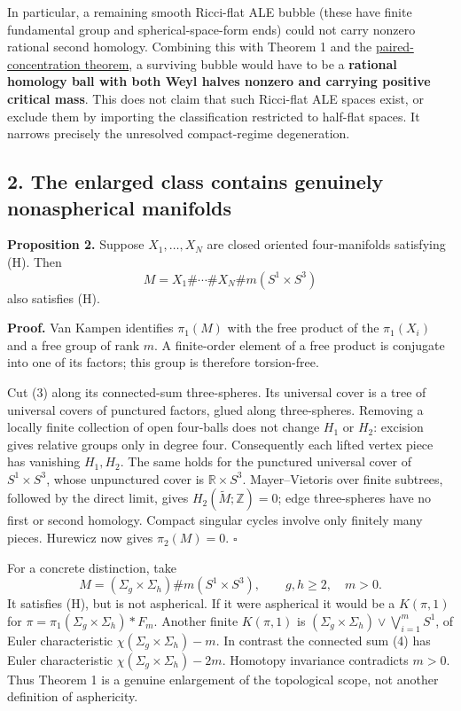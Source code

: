 \documentclass[
  11pt,
]{article}
\begin{document}
In particular, a remaining smooth Ricci-flat ALE bubble (these have
finite fundamental group and spherical-space-form ends) could not carry
nonzero rational second homology. Combining this with Theorem 1 and the
\href{20260923_critical_chiral_threshold.md}{paired-concentration
theorem}, a surviving bubble would have to be a \textbf{rational
homology ball with both Weyl halves nonzero and carrying positive
critical mass}. This does not claim that such Ricci-flat ALE spaces
exist, or exclude them by importing the classification restricted to
half-flat spaces. It narrows precisely the unresolved compact-regime
degeneration.

\hypertarget{the-enlarged-class-contains-genuinely-nonaspherical-manifolds}{%
\subsection{2. The enlarged class contains genuinely nonaspherical
manifolds}\label{the-enlarged-class-contains-genuinely-nonaspherical-manifolds}}

\textbf{Proposition 2.} Suppose \(X_1,\ldots,X_N\) are closed oriented
four-manifolds satisfying (H). Then \[
 M=X_1\#\cdots\#X_N\#m(S^1\times S^3)
 \tag{3}
\] also satisfies (H).

\textbf{Proof.} Van Kampen identifies \(\pi_1(M)\) with the free product
of the \(\pi_1(X_i)\) and a free group of rank \(m\). A finite-order
element of a free product is conjugate into one of its factors; this
group is therefore torsion-free.

Cut (3) along its connected-sum three-spheres. Its universal cover is a
tree of universal covers of punctured factors, glued along
three-spheres. Removing a locally finite collection of open four-balls
does not change \(H_1\) or \(H_2\): excision gives relative groups only
in degree four. Consequently each lifted vertex piece has vanishing
\(H_1,H_2\). The same holds for the punctured universal cover of
\(S^1\times S^3\), whose unpunctured cover is \(\mathbb R\times S^3\).
Mayer--Vietoris over finite subtrees, followed by the direct limit,
gives \(H_2(\widetilde M;\mathbb Z)=0\); edge three-spheres have no
first or second homology. Compact singular cycles involve only finitely
many pieces. Hurewicz now gives \(\pi_2(M)=0\). \(\square\)

For a concrete distinction, take \[
 M=(\Sigma_g\times\Sigma_h)\#m(S^1\times S^3),
 \qquad g,h\ge2,\quad m>0.                            \tag{4}
\] It satisfies (H), but is not aspherical. If it were aspherical it
would be a \(K(\pi,1)\) for \(\pi=\pi_1(\Sigma_g\times\Sigma_h)*F_m\).
Another finite \(K(\pi,1)\) is
\((\Sigma_g\times\Sigma_h)\vee\bigvee_{i=1}^m S^1\), of Euler
characteristic \(\chi(\Sigma_g\times\Sigma_h)-m\). In contrast the
connected sum (4) has Euler characteristic
\(\chi(\Sigma_g\times\Sigma_h)-2m\). Homotopy invariance contradicts
\(m>0\). Thus Theorem 1 is a genuine enlargement of the topological
scope, not another definition of asphericity.
\end{document}

